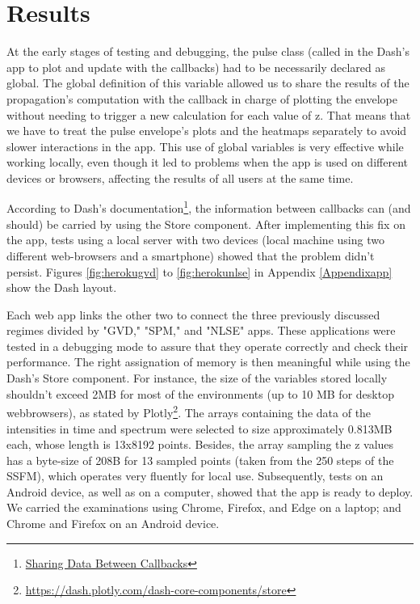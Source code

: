 \chapter{Results}
\label{results}
    At the early stages of testing and debugging, the pulse class (called in the Dash's app to plot and update with the callbacks) had to be necessarily declared as global. The global definition of this variable allowed us to share the results of the propagation's computation with the callback in charge of plotting the envelope without needing to trigger a new calculation for each value of z. That means that we have to treat the pulse envelope's plots and the heatmaps separately to avoid slower interactions in the app. This use of global variables is very effective while working locally, even though it led to problems when the app is used on different devices or browsers, affecting the results of all users at the same time.

According to Dash's documentation\footnote{\href{https://dash.plotly.com/sharing-data-between-callbacks}{Sharing Data Between Callbacks}}, the information between callbacks can (and should) be carried by using the Store component. After implementing this fix on the app, tests using a local server with two devices (local machine using two different web-browsers and a smartphone) showed that the problem didn't persist. Figures \ref{fig:herokugvd} to \ref{fig:herokunlse} in Appendix \ref{Appendixapp} show the Dash layout. 

Each web app links the other two to connect the three previously discussed regimes divided by "GVD," "SPM," and "NLSE" apps. These applications were tested in a debugging mode to assure that they operate correctly and check their performance.  The right assignation of memory is then meaningful while using the Dash's Store component. For instance, the size of the variables stored locally shouldn't exceed 2MB for most of the environments (up to 10 MB for desktop webbrowsers), as stated by Plotly\footnote{\url{https://dash.plotly.com/dash-core-components/store}}. The arrays containing the data of the intensities in time and spectrum were selected to size approximately 0.813MB each, whose length is 13x8192 points. Besides, the array sampling the z values has a byte-size of 208B for 13 sampled points (taken from the 250 steps of the SSFM), which operates very fluently for local use. Subsequently, tests on an Android device, as well as on a computer, showed that the app is ready to deploy. We carried the examinations using Chrome, Firefox, and Edge on a laptop; and Chrome and Firefox on an Android device.

